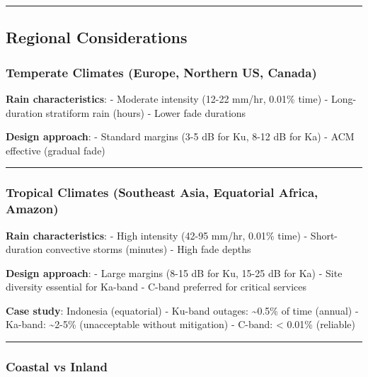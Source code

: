 \begin{center}\rule{0.5\linewidth}{0.5pt}\end{center}

\subsection{Regional Considerations}\label{regional-considerations}

\subsubsection{Temperate Climates (Europe, Northern US,
Canada)}\label{temperate-climates-europe-northern-us-canada}

\textbf{Rain characteristics}: - Moderate intensity (12-22 mm/hr, 0.01\%
time) - Long-duration stratiform rain (hours) - Lower fade durations

\textbf{Design approach}: - Standard margins (3-5 dB for Ku, 8-12 dB for
Ka) - ACM effective (gradual fade)

\begin{center}\rule{0.5\linewidth}{0.5pt}\end{center}

\subsubsection{Tropical Climates (Southeast Asia, Equatorial Africa,
Amazon)}\label{tropical-climates-southeast-asia-equatorial-africa-amazon}

\textbf{Rain characteristics}: - High intensity (42-95 mm/hr, 0.01\%
time) - Short-duration convective storms (minutes) - High fade depths

\textbf{Design approach}: - Large margins (8-15 dB for Ku, 15-25 dB for
Ka) - Site diversity essential for Ka-band - C-band preferred for
critical services

\textbf{Case study}: Indonesia (equatorial) - Ku-band outages:
\textasciitilde0.5\% of time (annual) - Ka-band: \textasciitilde2-5\%
(unacceptable without mitigation) - C-band: \textless{} 0.01\%
(reliable)

\begin{center}\rule{0.5\linewidth}{0.5pt}\end{center}

\subsubsection{Coastal vs Inland}\label{coastal-vs-inland}

